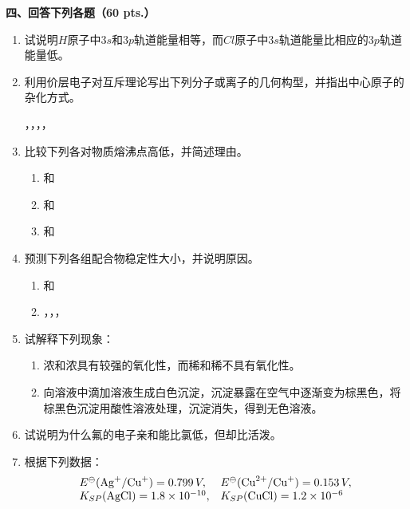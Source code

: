 \vspace{0.5cm}
\noindent\textbf{四、回答下列各题（60 pts.）}

\begin{enumerate}[label=\arabic*., start=1, itemsep=1.5ex]
    \item 试说明$H$原子中$3s$和$3p$轨道能量相等，而$Cl$原子中$3s$轨道能量比相应的$3p$轨道能量低。
    \item 利用价层电子对互斥理论写出下列分子或离子的几何构型，并指出中心原子的杂化方式。
    
    {\centering
    ，，，， \par
    }
    \item 比较下列各对物质熔沸点高低，并简述理由。
    \begin{enumerate}[label=(\arabic*), itemsep=1ex]
        \item {} 和 
        \item {} 和 
        \item {} 和 
    \end{enumerate}
    \item 预测下列各组配合物稳定性大小，并说明原因。
    \begin{enumerate}[label=(\arabic*), itemsep=1ex]
        \item {} 和 
        \item {}，，，
    \end{enumerate}
    \item 试解释下列现象：
    \begin{enumerate}[label=(\arabic*), itemsep=1ex]
        \item 浓和浓具有较强的氧化性，而稀和稀不具有氧化性。
        \item 向溶液中滴加溶液生成白色沉淀，沉淀暴露在空气中逐渐变为棕黑色，将棕黑色沉淀用酸性溶液处理，沉淀消失，得到无色溶液。
    \end{enumerate}
    \item 试说明为什么氟的电子亲和能比氯低，但却比活泼。
    \item 根据下列数据：
    \[
    \begin{array}{ll}
    E^\ominus(\ce{Ag+}/\ce{Cu+}) = 0.799\,V, & E^\ominus(\ce{Cu^{2+}}/\ce{Cu+}) = 0.153\,V, \\
    K_{SP}(\ce{AgCl}) = 1.8 \times 10^{-10}, & K_{SP}(\ce{CuCl}) = 1.2 \times 10^{-6}

\end{array}\]
\end{enumerate}
